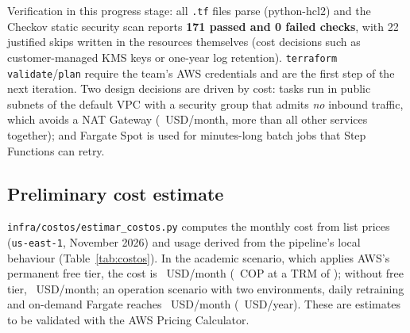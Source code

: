 \documentclass[conference,10pt]{IEEEtran}
\begin{document}
Verification in this progress stage: all \texttt{.tf} files parse (python-hcl2) and the Checkov static security scan reports \textbf{171 passed and 0 failed checks}, with 22 justified skips written in the resources themselves (cost decisions such as customer-managed KMS keys or one-year log retention). \texttt{terraform validate}/\texttt{plan} require the team's AWS credentials and are the first step of the next iteration. Two design decisions are driven by cost: tasks run in public subnets of the default VPC with a security group that admits \emph{no} inbound traffic, which avoids a NAT Gateway (\costoNat~USD/month, more than all other services together); and Fargate Spot is used for minutes-long batch jobs that Step Functions can retry.

\subsection{Preliminary cost estimate}
\texttt{infra/costos/estimar\_costos.py} computes the monthly cost from list prices (\texttt{us-east-1}, November 2026) and usage derived from the pipeline's local behaviour (Table~\ref{tab:costos}). In the academic scenario, which applies AWS's permanent free tier, the cost is \costoAcademicoUsd~USD/month (\costoAcademicoCop~COP at a TRM of \trm); without free tier, \costoSinGratisUsd~USD/month; an operation scenario with two environments, daily retraining and on-demand Fargate reaches \costoOperacionUsd~USD/month (\costoOperacionAnual~USD/year). These are estimates to be validated with the AWS Pricing Calculator.

\begin{table}[!t]
\caption{Preliminary monthly cost by service and scenario (USD, us-east-1)}\label{tab:costos}
\centering\scriptsize\setlength{\tabcolsep}{4pt}
\resizebox{\columnwidth}{!}{}
\end{table}

\end{document}
